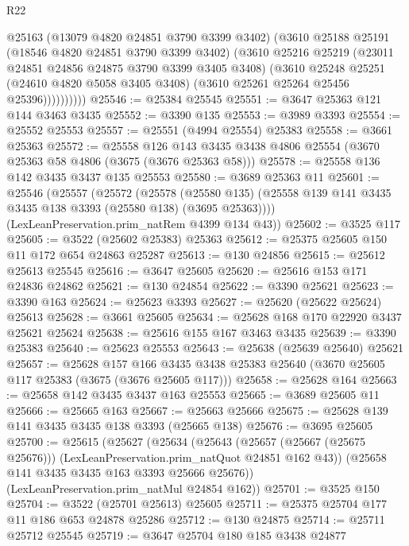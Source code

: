 \begin{lexlean}{R22}
\begin{coremodule}
                @25163
                (@13079 @4820 @24851 @3790 @3399 @3402)
                (@3610
                  @25188
                  @25191
                  (@18546 @4820 @24851 @3790 @3399 @3402)
                  (@3610
                    @25216
                    @25219
                    (@23011 @24851 @24856 @24875 @3790 @3399 @3405 @3408)
                    (@3610
                      @25248
                      @25251
                      (@24610 @4820 @5058 @3405 @3408)
                      (@3610 @25261 @25264 @25456 @25396))))))))))
@25546 := @25384 @25545
@25551 := @3647 @25363 @121 @144 @3463 @3435
@25552 := @3390 @135
@25553 := @3989 @3393
@25554 := @25552 @25553
@25557 := @25551 (@4994 @25554) @25383
@25558 := @3661 @25363
@25572 := @25558
    @126
    @143
    @3435
    @3438
    @4806
    @25554
    (@3670 @25363 @58 @4806 (@3675 (@3676 @25363 @58)))
@25578 := @25558 @136 @142 @3435 @3437 @135 @25553
@25580 := @3689 @25363 @11
@25601 := @25546
    (@25557
      (@25572
        (@25578
          (@25580 @135)
          (@25558 @139 @141 @3435 @3435 @138 @3393 (@25580 @138) (@3695 @25363))))
      (LexLeanPreservation.prim_natRem @4399 @134 @43))
@25602 := @3525 @117
@25605 := @3522 (@25602 @25383) @25363
@25612 := @25375 @25605 @150 @11 @172 @654 @24863 @25287
@25613 := @130 @24856
@25615 := @25612 @25613 @25545
@25616 := @3647 @25605
@25620 := @25616 @153 @171 @24836 @24862
@25621 := @130 @24854
@25622 := @3390 @25621
@25623 := @3390 @163
@25624 := @25623 @3393
@25627 := @25620 (@25622 @25624) @25613
@25628 := @3661 @25605
@25634 := @25628 @168 @170 @22920 @3437 @25621 @25624
@25638 := @25616 @155 @167 @3463 @3435
@25639 := @3390 @25383
@25640 := @25623 @25553
@25643 := @25638 (@25639 @25640) @25621
@25657 := @25628
    @157
    @166
    @3435
    @3438
    @25383
    @25640
    (@3670 @25605 @117 @25383 (@3675 (@3676 @25605 @117)))
@25658 := @25628 @164
@25663 := @25658 @142 @3435 @3437 @163 @25553
@25665 := @3689 @25605 @11
@25666 := @25665 @163
@25667 := @25663 @25666
@25675 := @25628 @139 @141 @3435 @3435 @138 @3393 (@25665 @138)
@25676 := @3695 @25605
@25700 := @25615
    (@25627
      (@25634
        (@25643
          (@25657 (@25667 (@25675 @25676)))
          (LexLeanPreservation.prim_natQuot @24851 @162 @43))
        (@25658 @141 @3435 @3435 @163 @3393 @25666 @25676))
      (LexLeanPreservation.prim_natMul @24854 @162))
@25701 := @3525 @150
@25704 := @3522 (@25701 @25613) @25605
@25711 := @25375 @25704 @177 @11 @186 @653 @24878 @25286
@25712 := @130 @24875
@25714 := @25711 @25712 @25545
@25719 := @3647 @25704 @180 @185 @3438 @24877

\end{coremodule}
\end{lexlean}
